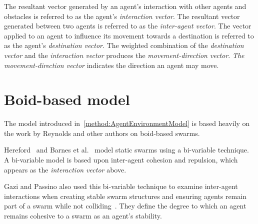 The resultant vector generated by an agent's interaction with other agents and obstacles is referred to as the agent's \textit{interaction vector}. The resultant vector generated between two agents is referred to as the \textit{inter-agent vector}. The vector applied to an agent to influence its movement towards a destination is referred to as the agent's \textit{destination vector}. The weighted combination of the \textit{destination vector} and the \textit{interaction vector} produces the \textit{movement-direction vector}. \textit{The movement-direction vector} indicates the direction an agent may move. 


\section{Boid-based model}\label{methods:BoidModel}
The model introduced in~\autoref{method:AgentEnvironmentModel} is based heavily on the work by Reynolds and other authors on boid-based swarms.

Hereford~\cite{HER:11} and Barnes et al.~\cite{BAF:06} model static swarms using a bi-variable technique. A bi-variable model is based upon inter-agent cohesion and repulsion, which appears as the \textit{interaction vector} above. 

Gazi and Passino also used this bi-variable technique to examine inter-agent interactions when creating stable swarm structures and ensuring agents remain part of a swarm while not colliding~\cite{GP:04a, GP:02, GP:04}. They define the degree to which an agent remains cohesive to a swarm as an agent's stability. 

